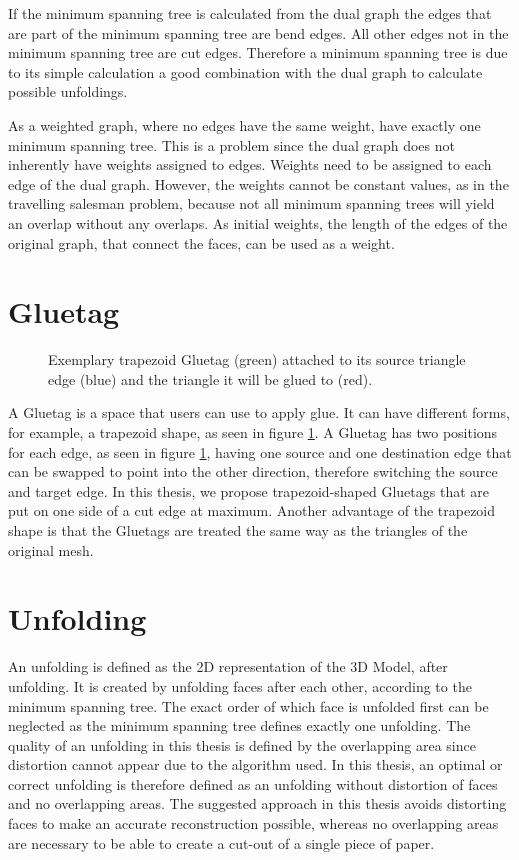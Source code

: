 \documentclass[draft,final]{vutinfth} %
\begin{document}
If the minimum spanning tree is calculated from the dual graph the edges that are part of the minimum spanning tree are bend edges. All other edges not in the minimum spanning tree are cut edges. Therefore a minimum spanning tree is due to its simple calculation a good combination with the dual graph to calculate possible unfoldings. 

As a weighted graph, where no edges have the same weight, have exactly one minimum spanning tree. This is a problem since the dual graph does not inherently have weights assigned to edges. Weights need to be assigned to each edge of the dual graph. However, the weights cannot be constant values, as in the travelling salesman problem, because not all minimum spanning trees will yield an overlap without any overlaps. 
As initial weights, the length of the edges of the original graph, that connect the faces, can be used as a weight.

\section{Gluetag}
\begin{figure}

\caption{Exemplary trapezoid Gluetag (green) attached to its source triangle edge (blue) and the triangle it will be glued to (red).}
\label{fig:Gluetag}
\end{figure}

A Gluetag is a space that users can use to apply glue. It can have different forms, for example, a trapezoid shape, as seen in figure \ref{fig:Gluetag}. A Gluetag has two positions for each edge, as seen in figure \ref{fig:Gluetag}, having one source and one destination edge that can be swapped to point into the other direction, therefore switching the source and target edge. In this thesis, we propose trapezoid-shaped Gluetags that are put on one side of a cut edge at maximum. Another advantage of the trapezoid shape is that the Gluetags are treated the same way as the triangles of the original mesh.

\section{Unfolding}
An unfolding is defined as the 2D representation of the 3D Model, after unfolding. It is created by unfolding faces after each other, according to the minimum spanning tree. The exact order of which face is unfolded first can be neglected as the minimum spanning tree defines exactly one unfolding. The quality of an unfolding in this thesis is defined by the overlapping area since distortion cannot appear due to the algorithm used. In this thesis, an optimal or correct unfolding is therefore defined as an unfolding without distortion of faces and no overlapping areas. The suggested approach in this thesis avoids distorting faces to make an accurate reconstruction possible, whereas no overlapping areas are necessary to be able to create a cut-out of a single piece of paper.
\end{document}

